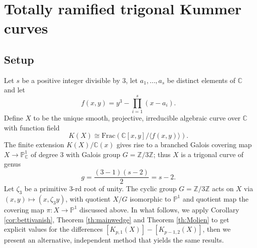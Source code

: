 \documentclass[10pt]{amsart}
\theoremstyle{definition}
\begin{document}
\section{Totally ramified trigonal Kummer curves}\label{sec:Kummer}

\subsection{Setup}
Let $s$ be a positive integer divisible by $3$, let $a_1,\ldots,a_s$ be distinct elements of $\mathbb{C}$ and let
\begin{equation}\label{eq:trigonal}
f(x,y)=    y^3 - \prod_{i=1}^s (x - a_i).
\end{equation}
Define $X$ to be the unique smooth, projective, irreducible algebraic curve over $\mathbb{C}$ with function field
\[
K(X)\cong \text{Frac}\left( \mathbb{C}[x,y] / \langle f(x,y)\rangle \right).
\]
The finite extension $K(X)/\mathbb{C}(x)$ gives rise to a branched Galois covering map $X\rightarrow \mathbb{P}^1_\mathbb{C}$ of degree 3 with Galois group $G = \mathbb{Z}/3\mathbb{Z}$; thus $X$ is a trigonal curve of genus 
\[
g=\frac{(3-1)(s-2)}{2}=s-2.
\]
Let $\zeta_3$ be a primitive $3$-rd root of unity. The cyclic group $G = \mathbb{Z}/3\mathbb{Z}$ acts on $X$ via $(x,y)\mapsto (x,\zeta_3y)$, with quotient $X/G$  isomorphic to $\mathbb{P}^1$ and quotient map the covering map $\pi: X \to \mathbb{P}^1$ discussed above. In what follows, we apply Corollary \ref{cor:bettivanish}, Theorem \ref{th:mainwedge} and Theorem \ref{th:Molien} to get explicit values for the differences $[K_{p,1}(X)]-[K_{p-1,2}(X)]$, then we present an alternative, independent method that yields the same results.
\end{document}
